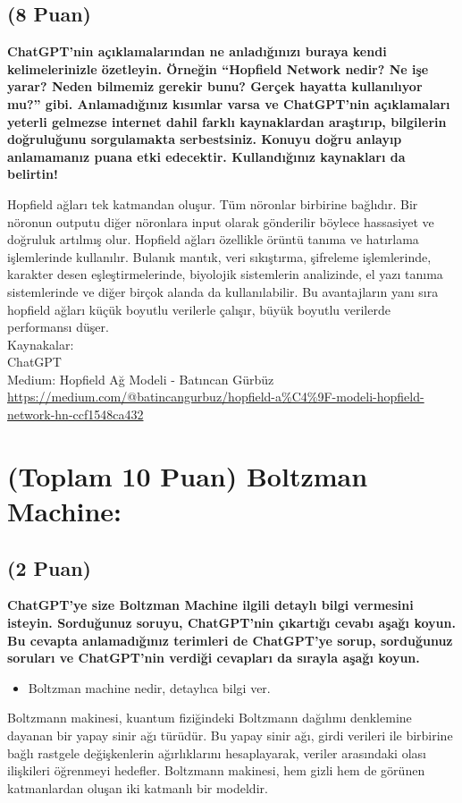 \documentclass[11pt]{article}
\begin{document}
\subsection{(8 Puan)} \textbf{ChatGPT’nin açıklamalarından ne anladığınızı buraya kendi kelimelerinizle özetleyin. Örneğin ``Hopfield Network nedir? Ne işe yarar? Neden bilmemiz gerekir bunu? Gerçek hayatta kullanılıyor mu?'' gibi. Anlamadığınız kısımlar varsa ve ChatGPT’nin açıklamaları yeterli gelmezse internet dahil farklı kaynaklardan araştırıp, bilgilerin doğruluğunu sorgulamakta serbestsiniz. Konuyu doğru anlayıp anlamamanız puana etki edecektir. Kullandığınız kaynakları da belirtin!}

Hopfield ağları tek katmandan oluşur. Tüm nöronlar birbirine bağlıdır. Bir nöronun outputu diğer nöronlara input olarak gönderilir böylece hassasiyet ve doğruluk artılmış olur. Hopfield ağları özellikle örüntü tanıma ve hatırlama işlemlerinde kullanılır. Bulanık mantık, veri sıkıştırma, şifreleme işlemlerinde, karakter desen eşleştirmelerinde, biyolojik sistemlerin analizinde, el yazı tanıma sistemlerinde ve diğer birçok alanda da kullanılabilir. Bu avantajların yanı sıra hopfield ağları küçük boyutlu verilerle çalışır, büyük boyutlu verilerde performansı düşer. \\
Kaynakalar: \\
ChatGPT \\
Medium: Hopfield Ağ Modeli - Batıncan Gürbüz \url{https://medium.com/@batincangurbuz/hopfield-a%C4%9F-modeli-hopfield-network-hn-ccf1548ca432}
\section{(Toplam 10 Puan) Boltzman Machine:}

\subsection{(2 Puan)} \textbf{ChatGPT’ye size Boltzman Machine ilgili detaylı bilgi vermesini isteyin. Sorduğunuz soruyu, ChatGPT'nin çıkartığı cevabı aşağı koyun. Bu cevapta anlamadığınız terimleri de ChatGPT’ye sorup, sorduğunuz soruları ve ChatGPT’nin verdiği cevapları da sırayla aşağı koyun.}

\begin{itemize}
    \item Boltzman machine nedir, detaylıca bilgi ver.
\end{itemize}
Boltzmann makinesi, kuantum fiziğindeki Boltzmann dağılımı denklemine dayanan bir yapay sinir ağı türüdür. Bu yapay sinir ağı, girdi verileri ile birbirine bağlı rastgele değişkenlerin ağırlıklarını hesaplayarak, veriler arasındaki olası ilişkileri öğrenmeyi hedefler. Boltzmann makinesi, hem gizli hem de görünen katmanlardan oluşan iki katmanlı bir modeldir.
\end{document}
